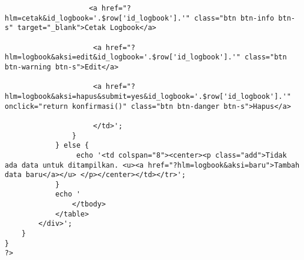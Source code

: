 \begin{lstlisting}
					<a href="?hlm=cetak&id_logbook='.$row['id_logbook'].'" class="btn btn-info btn-s" target="_blank">Cetak Logbook</a>

					 <a href="?hlm=logbook&aksi=edit&id_logbook='.$row['id_logbook'].'" class="btn btn-warning btn-s">Edit</a>

					 <a href="?hlm=logbook&aksi=hapus&submit=yes&id_logbook='.$row['id_logbook'].'" onclick="return konfirmasi()" class="btn btn-danger btn-s">Hapus</a>

					 </td>';
				}
			} else {
				 echo '<td colspan="8"><center><p class="add">Tidak ada data untuk ditampilkan. <u><a href="?hlm=logbook&aksi=baru">Tambah data baru</a></u> </p></center></td></tr>';
			}
			echo '
			 	</tbody>
			</table>
		</div>';
	}
}
?>
\end{lstlisting}

